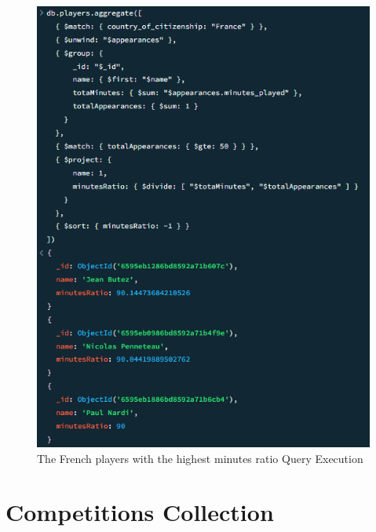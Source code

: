 \documentclass{Configuration_Files/PoliMi3i_thesis}
\begin{document}
\begin{figure}[htbp]
    \centering
    \includegraphics[scale=1]{Images/Queries/French_minutes_ratio/fmr.png}
    \caption{The French players with the highest minutes ratio Query Execution}
\end{figure}

\section{Competitions Collection }
\end{document}
